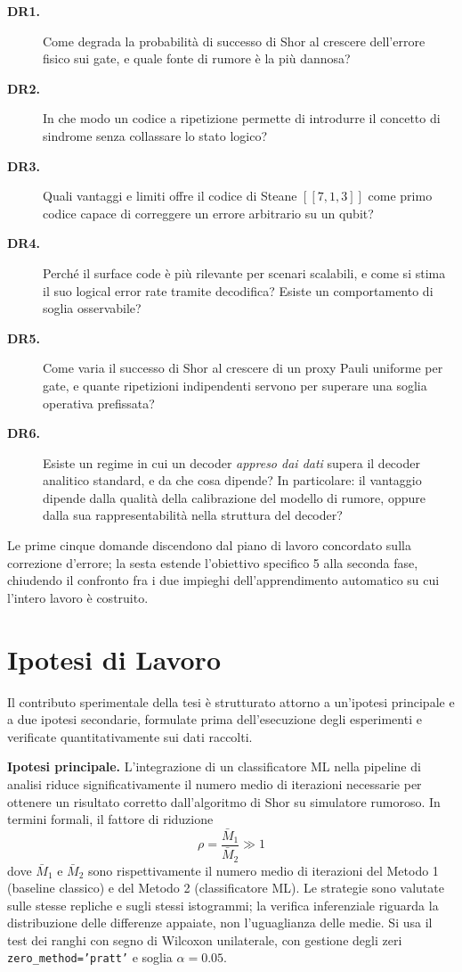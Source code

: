 \begin{onehalfspace}
\begin{description}
    \item[\textbf{DR1.}] Come degrada la probabilità di successo di Shor al crescere dell'errore fisico sui gate, e quale fonte di rumore è la più dannosa?
    \item[\textbf{DR2.}] In che modo un codice a ripetizione permette di introdurre il concetto di sindrome senza collassare lo stato logico?
    \item[\textbf{DR3.}] Quali vantaggi e limiti offre il codice di Steane $[[7,1,3]]$ come primo codice capace di correggere un errore arbitrario su un qubit?
    \item[\textbf{DR4.}] Perché il surface code è più rilevante per scenari scalabili, e come si stima il suo logical error rate tramite decodifica? Esiste un comportamento di soglia osservabile?
    \item[\textbf{DR5.}] Come varia il successo di Shor al crescere di un proxy Pauli uniforme per gate, e quante ripetizioni indipendenti servono per superare una soglia operativa prefissata?
    \item[\textbf{DR6.}] Esiste un regime in cui un decoder \emph{appreso dai dati} supera il decoder analitico standard, e da che cosa dipende? In particolare: il vantaggio dipende dalla qualità della calibrazione del modello di rumore, oppure dalla sua rappresentabilità nella struttura del decoder?
\end{description}

Le prime cinque domande discendono dal piano di lavoro concordato sulla correzione d'errore; la sesta estende l'obiettivo specifico 5 alla seconda fase, chiudendo il confronto fra i due impieghi dell'apprendimento automatico su cui l'intero lavoro è costruito.

\section{Ipotesi di Lavoro}
\label{sec:ipotesi}

Il contributo sperimentale della tesi è strutturato attorno a un'ipotesi principale e a due ipotesi secondarie, formulate prima dell'esecuzione degli esperimenti e verificate quantitativamente sui dati raccolti.

\textbf{Ipotesi principale.} L'integrazione di un classificatore ML nella pipeline di analisi riduce significativamente il numero medio di iterazioni necessarie per ottenere un risultato corretto dall'algoritmo di Shor su simulatore rumoroso. In termini formali, il fattore di riduzione
\begin{equation}
    \rho = \frac{\bar{M}_1}{\bar{M}_2} \gg 1
    \label{eq:ipotesi_rho}
\end{equation}
dove $\bar{M}_1$ e $\bar{M}_2$ sono rispettivamente il numero medio di iterazioni del Metodo 1 (baseline classico) e del Metodo 2 (classificatore ML). Le strategie sono valutate sulle stesse repliche e sugli stessi istogrammi; la verifica inferenziale riguarda la distribuzione delle differenze appaiate, non l'uguaglianza delle medie. Si usa il test dei ranghi con segno di Wilcoxon unilaterale, con gestione degli zeri \texttt{zero\_method='pratt'} e soglia $\alpha=0.05$.


\end{onehalfspace}
